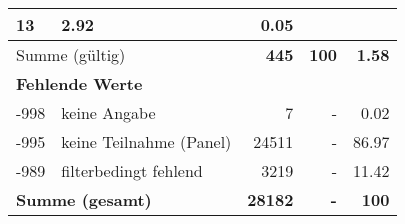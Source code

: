 \begin{longtable}{lXrrr}
       \num{13} &
       \num[round-mode=places,round-precision=2]{2,92} &
         \num[round-mode=places,round-precision=2]{0,05} \\
     \midrule
     \multicolumn{2}{l}{Summe (gültig)} &
       \textbf{\num{445}} &
     \textbf{100} &
       \textbf{\num[round-mode=places,round-precision=2]{1,58}} \\
     \multicolumn{5}{l}{\textbf{Fehlende Werte}}\\
       -998 &
       keine Angabe &
         \num{7} &
        - &
         \num[round-mode=places,round-precision=2]{0,02} \\
       -995 &
       keine Teilnahme (Panel) &
         \num{24511} &
        - &
         \num[round-mode=places,round-precision=2]{86,97} \\
       -989 &
       filterbedingt fehlend &
         \num{3219} &
        - &
         \num[round-mode=places,round-precision=2]{11,42} \\
     \midrule
     \multicolumn{2}{l}{\textbf{Summe (gesamt)}} &
          \textbf{\num{28182}} &
        \textbf{-} &
        \textbf{100} \\
     \bottomrule
     \end{longtable}
     

